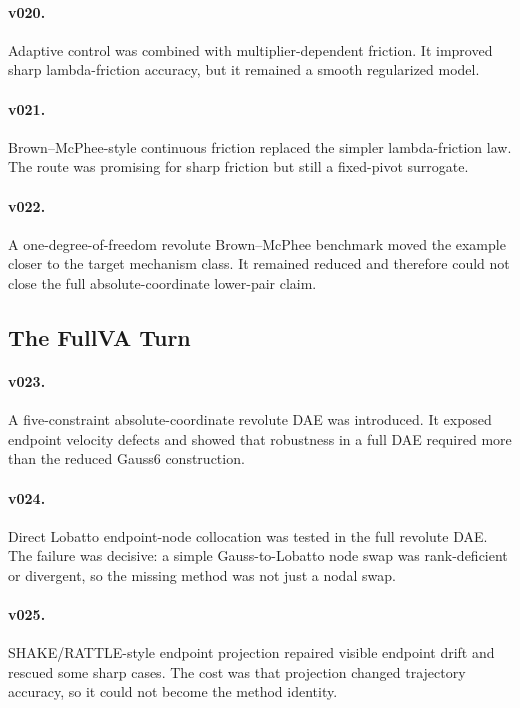 \documentclass[10pt]{article}
\begin{document}
\paragraph{v020.}
Adaptive control was combined with multiplier-dependent friction. It improved
sharp lambda-friction accuracy, but it remained a smooth regularized model.

\paragraph{v021.}
Brown--McPhee-style continuous friction replaced the simpler lambda-friction
law. The route was promising for sharp friction but still a fixed-pivot
surrogate.

\paragraph{v022.}
A one-degree-of-freedom revolute Brown--McPhee benchmark moved the example
closer to the target mechanism class. It remained reduced and therefore could not close the full
absolute-coordinate lower-pair claim.

\subsection{The FullVA Turn}

\paragraph{v023.}
A five-constraint absolute-coordinate revolute DAE was introduced. It exposed
endpoint velocity defects and showed that robustness in a full DAE required
more than the reduced Gauss6 construction.

\paragraph{v024.}
Direct Lobatto endpoint-node collocation was tested in the full revolute DAE.
The failure was decisive: a simple Gauss-to-Lobatto node swap was
rank-deficient or divergent, so the missing method was not just a nodal swap.

\paragraph{v025.}
SHAKE/RATTLE-style endpoint projection repaired visible endpoint drift and
rescued some sharp cases. The cost was that projection changed trajectory
accuracy, so it could not become the method identity.
\end{document}
